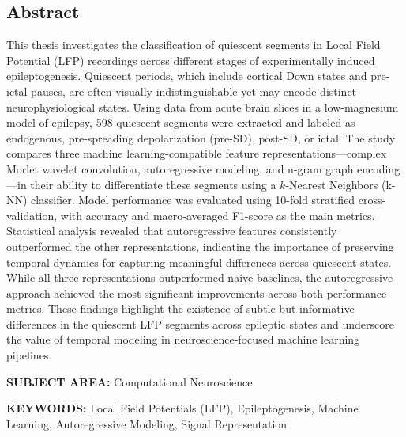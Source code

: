 \documentclass{article}
\begin{document}
\begin{center}
	\section*{Abstract}
\end{center}
	\noindent
	This thesis investigates the classification of quiescent segments in Local Field Potential (LFP) recordings across different stages of experimentally induced epileptogenesis. Quiescent periods, which include cortical Down states and pre-ictal pauses, are often visually indistinguishable yet may encode distinct neurophysiological states. Using data from acute brain slices in a low-magnesium model of epilepsy, 598 quiescent segments were extracted and labeled as endogenous, pre-spreading depolarization (pre-SD), post-SD, or ictal. The study compares three machine learning-compatible feature representations—complex Morlet wavelet convolution, autoregressive modeling, and n-gram graph encoding—in their ability to differentiate these segments using a $k$-Nearest Neighbors (k-NN) classifier. Model performance was evaluated using 10-fold stratified cross-validation, with accuracy and macro-averaged F1-score as the main metrics. Statistical analysis revealed that autoregressive features consistently outperformed the other representations, indicating the importance of preserving temporal dynamics for capturing meaningful differences across quiescent states. While all three representations outperformed naive baselines, the autoregressive approach achieved the most significant improvements across both performance metrics. These findings highlight the existence of subtle but informative differences in the quiescent LFP segments across epileptic states and underscore the value of temporal modeling in neuroscience-focused machine learning pipelines.

\vfill

\noindent
\textbf{SUBJECT AREA:} Computational Neuroscience

\vspace{0.5em}

\noindent
\textbf{KEYWORDS:} Local Field Potentials (LFP), Epileptogenesis, Machine Learning, Autoregressive Modeling, Signal Representation

\newpage
\end{document}
